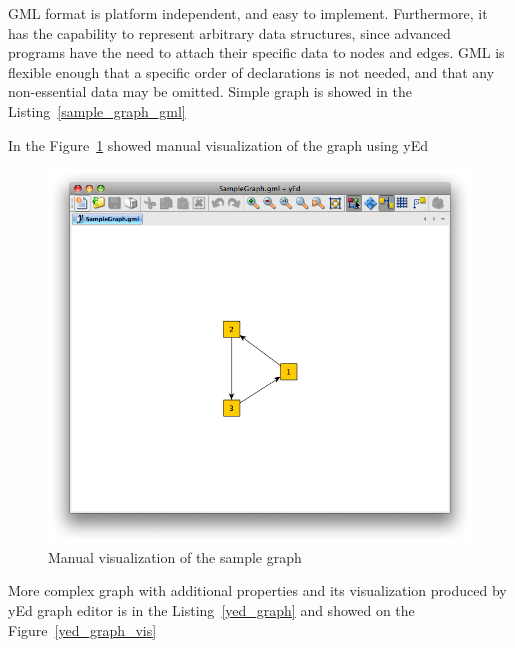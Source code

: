 \documentclass[a4paper,oneside]{article}
\begin{document}
 
GML format is platform independent, and easy to implement. Furthermore, it has the capability to represent arbitrary data structures, since advanced programs have the need to attach their specific data to nodes and edges. GML is flexible enough that a specific order of declarations is not needed, and that any non-essential data may be omitted. Simple graph is showed in the Listing~\ref{sample_graph_gml}


\begin{center}
	
\end{center}


In the Figure~\ref{sample_graph_yed_vis} showed manual visualization of the graph using yEd~\cite{yEd}


\begin{center}
\begin{figure}
	\includegraphics[scale=0.5]{SampleGraph.png}
	\caption{Manual visualization of the sample graph}
	\label{sample_graph_yed_vis}
\end{figure}
\end{center}


More complex graph with additional properties and its visualization produced by yEd graph editor is in the Listing~\ref{yed_graph} and showed on the Figure~\ref{yed_graph_vis}


\begin{center}
	
\end{center}
\end{document}
